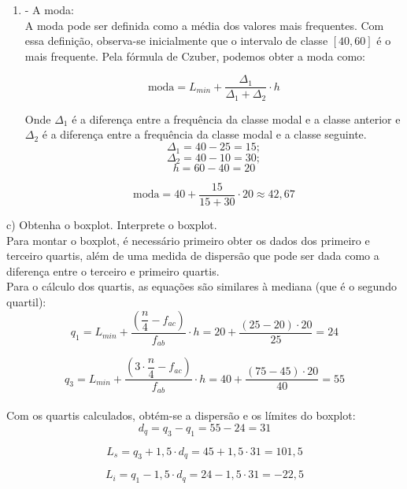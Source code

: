 \begin{enumerate}[i]
    \item- A moda:
          \\

          A moda pode ser definida como a média dos valores mais frequentes. Com essa definição, observa-se inicialmente que o intervalo de classe $[40,60]$ é o mais frequente. Pela fórmula de Czuber, podemos obter a moda como:

          \[
              \text{moda} = L_{min} + \frac{\varDelta_1}{\varDelta_1 + \varDelta_2} \cdot h
          \]

          Onde $\varDelta_1$ é a diferença entre a frequência da classe modal e a classe anterior e $\varDelta_2$ é a diferença entre a frequência da classe modal e a classe seguinte.
          \\
          \[\varDelta_1 = 40 - 25 = 15; \]
          \[\varDelta_2 = 40 - 10 = 30; \]
          \[h= 60-40=20 \]

          \begin{equation}
              \text{moda} = 40 + \frac{15}{15+30} \cdot 20 \approx  42,67
          \end{equation}
\end{enumerate}

c) Obtenha o boxplot. Interprete o boxplot.
\\

Para montar o boxplot, é necessário primeiro obter os dados dos primeiro e terceiro quartis, além de uma medida de dispersão que pode ser dada como a diferença entre o terceiro e primeiro quartis.
\\

Para o cálculo dos quartis, as equações são similares à mediana (que é o segundo quartil):
\\

\[
    q_1 = L_{min} + \frac{\left(\dfrac{n}{4}-f_{ac}\right)}{f_{ab}}\cdot h = 20 + \frac{(25-20)\cdot 20}{25} = 24
\]

\[
    q_3 = L_{min} + \frac{\left(3\cdot\dfrac{n}{4}-f_{ac}\right)}{f_{ab}}\cdot h = 40 + \frac{(75-45)\cdot 20}{40} = 55
\]
\\

Com os quartis calculados, obtém-se a dispersão e os límites do boxplot:
\\

\[
    d_q = q_3 - q_1 = 55 - 24 = 31
\]

\[
    L_s = q_3 + 1,5\cdot d_q = 45 +1,5\cdot 31 = 101,5
\]

\[
    L_i = q_1 - 1,5\cdot d_q = 24 - 1,5\cdot 31 = -22,5
\]
\\

